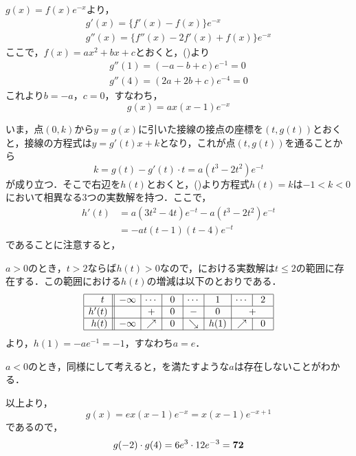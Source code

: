 \documentclass[fleqn,twocolumn,9pt]{jsarticle}
\begin{document}

\Question  %
$g(x)=f(x)e^{-x}$より，
\begin{gather*}
  g'(x) = \{ f'(x) - f(x) \} e^{-x} \\
  g''(x) = \{ f''(x) - 2f'(x) + f(x) \} e^{-x}
\end{gather*}
ここで，$f(x)=ax^2+bx+c$とおくと，()より
\begin{gather*}
  g''(1) = (-a-b+c) e^{-1} = 0 \\
  g''(4) = (2a+2b+c) e^{-4} = 0
\end{gather*}
これより$b=-a$，$c=0$，すなわち，
\begin{equation*}
  g(x) = ax(x-1)e^{-x}
\end{equation*}

いま，点$(0,k)$から$y = g(x)$に引いた接線の接点の座標を$(t,g(t))$とおくと，接線の方程式は$y = g'(t) x + k$となり，これが点$(t,g(t))$を通ることから
\begin{equation*}
  k = g(t) - g'(t) \cdot t = a (t^3-2t^2) e^{-t}
\end{equation*}
が成り立つ．そこで右辺を$h(t)$とおくと，()より方程式$h(t) = k$は$-1 < k < 0$において相異なる3つの実数解を持つ．ここで，
\begin{align*}
  h'(t) &= a (3t^2-4t) e^{-t} - a (t^3-2t^2) e^{-t} \\
  &= -a t (t-1) (t-4) e^{-t}
\end{align*}
であることに注意すると，

%
$a > 0$のとき，$t > 2$ならば$h(t) > 0$なので，における実数解は$t \le 2$の範囲に存在する．この範囲における$h(t)$の増減は以下のとおりである．
\begin{equation*}
  \def\C#1{\makebox[1.2em][c]{$#1$}}%
  \begin{array}{|r||c|c|c|c|c|c|c|}
    \hline
    t\  & \C{-\infty} & \C{\cdots} & \C{0} & \C{\cdots} & \C{1} & \C{\cdots} & \C{2} \\
    \hline
    h'(t) & & + & 0 & - & 0 & \multicolumn{2}{c|}{+} \\
    \hline
    h(t) & -\infty & \nearrow & 0 & \searrow & h(1) & \nearrow & 0 \\
    \hline
  \end{array}
\end{equation*}
より，$h(1)=-ae^{-1}=-1$，すなわち$a=e$．

%
$a < 0$のとき，同様にして考えると，を満たすような$a$は存在しないことがわかる．

以上より，
\begin{equation*}
  g(x) = ex(x-1) e^{-x} = x(x-1)e^{-x+1}
\end{equation*}
であるので，
\begin{equation*}
  g(-2) \cdot g(4) = 6e^3 \cdot 12e^{-3} = \boldsymbol{72}
\end{equation*}

\end{document}

